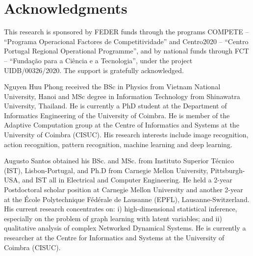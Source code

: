 \documentclass{ieeeaccess}
\begin{document}
\section*{Acknowledgments}
This research is sponsored by FEDER funds through the programs COMPETE -- ``Programa Operacional Factores de Competitividade'' and Centro2020 -- ``Centro Portugal Regional Operational Programme'', and by national funds through FCT -- ``Funda\c{c}\~{a}o para a Ci\^encia e a Tecnologia'', under the project UIDB/00326/2020. 
The support is gratefully acknowledged.


\clearpage
\begin{IEEEbiography}
{Nguyen Huu Phong}
received the BSc in Physics from Vietnam National University, Hanoi and MSc degree in Information Technology from Shinawatra University, Thailand. He is currently a PhD student at the Department of Informatics Engineering of the University of Coimbra. He is member of the Adaptive Computation group at the Centre of Informatics and Systems at the University of Coimbra (CISUC). His research interests include image recognition, action recognition, pattern recognition, machine learning and deep learning.
\end{IEEEbiography}
\begin{IEEEbiography}
{Augusto Santos}
obtained his BSc. and MSc. from Instituto Superior Técnico (IST), Lisbon-Portugal, and Ph.D from Carnegie Mellon University, Pittsburgh-USA, and IST all in Electrical and Computer Engineering. He held a 2-year Postdoctoral scholar position at Carnegie Mellon University and another 2-year at the École Polytechnique Fédérale de Lausanne (EPFL), Lausanne-Switzerland. His current research concentrates on: i) high-dimensional statistical inference, especially on the problem of graph learning with latent variables; and ii) qualitative analysis of complex Networked Dynamical Systems. He is currently a researcher at the Centre for Informatics and Systems at the University of Coimbra (CISUC).
\end{IEEEbiography}
\end{document}
